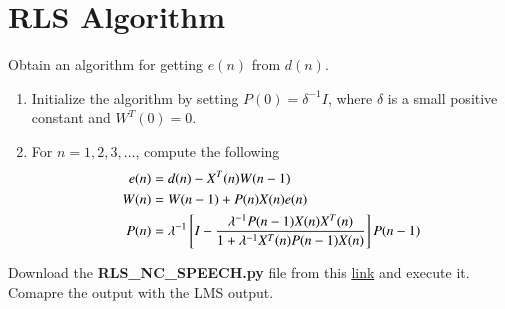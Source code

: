\documentclass[journal,12pt,twocolumn]{IEEEtran}
\begin{document}
\section{RLS Algorithm}
\begin{problem}
Obtain an algorithm for getting $e(n)$ from $d(n)$.
\end{problem}
\solution
\begin{enumerate}
\item Initialize the algorithm by setting $P(0) = \delta ^{-1} I$, where $\delta$ is a small positive constant and
$W^{T}(0)=0$. 
\item For $n=1,2,3, \dots$,
 compute the following
 {\small
 \begin{align}
e(n) &= d(n)- X^{T}(n)W(n-1)\\
W(n)&= W(n-1)+P(n)X(n)e(n)\\
P(n)&=\lambda ^{-1}{}\left[I -\frac{\lambda ^{-1}P(n-1)X(n)X^{T}(n)}{1+ \lambda ^{-1}X^{T}(n)P(n-1)X(n)}\right]P(n-1)
\end{align}
}
\end{enumerate}
\begin{problem}
Download the \textbf{RLS\_NC\_SPEECH.py} file from this \href{{https://github.com/gadepall/adsp.git}}{\url{link}} 
and execute it. Comapre the output with the LMS output.
\end{problem}
%
\end{document}
